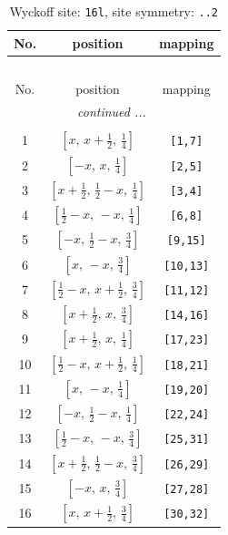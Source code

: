 \documentclass[fleqn,8pt]{jsarticle}
\begin{document}
\renewcommand{\arraystretch}{1.2}
\begin{longtable}{ccc}
\caption{Wyckoff site: {\tt 16l}, site symmetry: {\tt ..2}}
 \\
 \hline \hline
No. & position & mapping \\ \hline \endfirsthead

\multicolumn{2}{l}{\tablename\ \thetable{}} \\
 \hline \hline
No. & position & mapping \\ \hline \endhead

 \hline \hline
\multicolumn{2}{r}{\footnotesize\it continued ...} \\ \endfoot

 \hline \hline
\multicolumn{2}{r}{} \\ \endlastfoot

1 & $\left[ x,\, x + \frac{1}{2},\, \frac{1}{4} \right]$ & {\tt [1,7]} \\ \hline
2 & $\left[ - x,\, x,\, \frac{1}{4} \right]$ & {\tt [2,5]} \\ \hline
3 & $\left[ x + \frac{1}{2},\, \frac{1}{2} - x,\, \frac{1}{4} \right]$ & {\tt [3,4]} \\ \hline
4 & $\left[ \frac{1}{2} - x,\, - x,\, \frac{1}{4} \right]$ & {\tt [6,8]} \\ \hline
5 & $\left[ - x,\, \frac{1}{2} - x,\, \frac{3}{4} \right]$ & {\tt [9,15]} \\ \hline
6 & $\left[ x,\, - x,\, \frac{3}{4} \right]$ & {\tt [10,13]} \\ \hline
7 & $\left[ \frac{1}{2} - x,\, x + \frac{1}{2},\, \frac{3}{4} \right]$ & {\tt [11,12]} \\ \hline
8 & $\left[ x + \frac{1}{2},\, x,\, \frac{3}{4} \right]$ & {\tt [14,16]} \\ \hline
9 & $\left[ x + \frac{1}{2},\, x,\, \frac{1}{4} \right]$ & {\tt [17,23]} \\ \hline
10 & $\left[ \frac{1}{2} - x,\, x + \frac{1}{2},\, \frac{1}{4} \right]$ & {\tt [18,21]} \\ \hline
11 & $\left[ x,\, - x,\, \frac{1}{4} \right]$ & {\tt [19,20]} \\ \hline
12 & $\left[ - x,\, \frac{1}{2} - x,\, \frac{1}{4} \right]$ & {\tt [22,24]} \\ \hline
13 & $\left[ \frac{1}{2} - x,\, - x,\, \frac{3}{4} \right]$ & {\tt [25,31]} \\ \hline
14 & $\left[ x + \frac{1}{2},\, \frac{1}{2} - x,\, \frac{3}{4} \right]$ & {\tt [26,29]} \\ \hline
15 & $\left[ - x,\, x,\, \frac{3}{4} \right]$ & {\tt [27,28]} \\ \hline
16 & $\left[ x,\, x + \frac{1}{2},\, \frac{3}{4} \right]$ & {\tt [30,32]} \\
\end{longtable}
\end{document}

